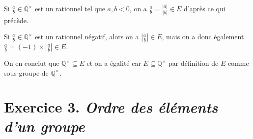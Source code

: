 \documentclass[./main]{subfiles}
\begin{document}
\begin{enumerate}
      Si $\frac{a}{b} \in \mathds{Q}^\times$ est un rationnel tel que $a,b < 0$, on a $\frac{a}{b} = \frac{|a|}{|b|} \in E$ d'après ce qui précède.

      Si $\frac{a}{b} \in \mathds{Q}^\times$ est un rationnel négatif, alors on a $\left|\frac{a}{b}\right| \in E$, mais on a donc également $\frac{a}{b} = (-1) \times \left|\frac{a}{b}\right| \in E$.

      On en conclut que $\mathds{Q}^\times  \subseteq E$ et on a égalité car $E \subseteq \mathds{Q}^\times $ par définition de $E$ comme sous-groupe de $\mathds{Q}^{\times }$.
  \end{enumerate}

  \section{Exercice 3. \textit{Ordre des éléments d'un groupe}}\label{td1-ex3}
\end{document}
